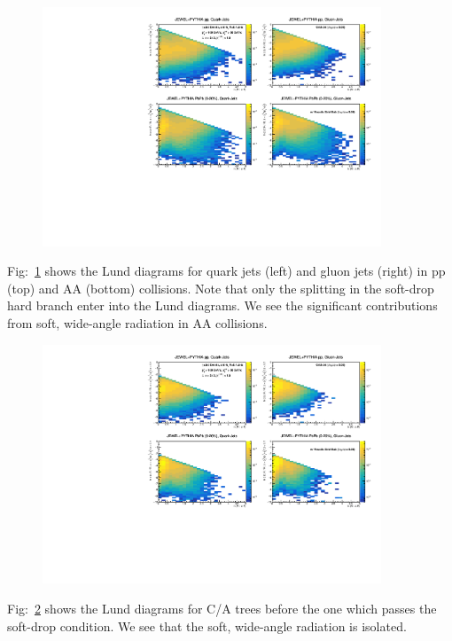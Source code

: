 \documentclass[notoc]{JHEP3}
\begin{document}
\begin{figure}
	   \centering
	   \includegraphics[width=0.9\textwidth]{plots/Individual_LundDiagrams_zrel.pdf}
	   \caption{}
\label{fig:Lund_full}
\end{figure}
Fig:~\ref{fig:Lund_full} shows the Lund diagrams for quark jets (left) and gluon jets (right) in pp (top) and AA (bottom) collisions. Note that only the splitting in the soft-drop hard branch enter into the Lund diagrams. We see the significant contributions from soft, wide-angle radiation in AA collisions.

\begin{figure}
	   \centering
	   \includegraphics[width=0.9\textwidth]{plots/Individual_LundDiagrams_zrel_background.pdf}
	   \caption{}
\label{fig:Lund_bkg}
\end{figure}
Fig:~\ref{fig:Lund_bkg} shows the Lund diagrams for C/A trees before the one which passes the soft-drop condition. We see that the soft, wide-angle radiation is isolated. 
\end{document}
